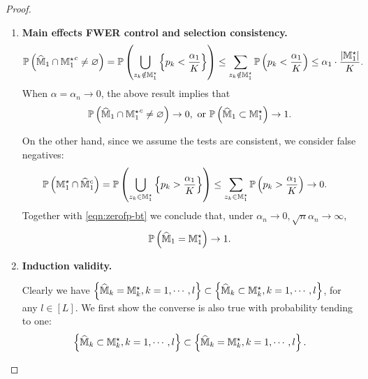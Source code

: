 \documentclass[12pt]{article}
\begin{document}
\begin{proof}
\begin{enumerate}
     Note that when $\alpha_k\to 0, N\to\infty$, we have
    \begin{align*}
        Z_k^\star =  \Theta\lt(\sqrt{2\ln\frac{2|\bbM_{k,+}^\star|}{\alpha_k}}\rt) =  \Theta(\max\{-\delta'\ln N,1\}),~ \lt|\frac{\tau_\cK}{s_\cK}\rt| =  \Theta(N^{1/2+\delta}).
    \end{align*}
    Since $\delta>-1/2$ and $\delta'\le 0$, we have $|\frac{\tau_\cK}{s_\cK}| \to \infty$ and $Z_k^\star/(|\frac{\tau_\cK}{s_\cK}|) \to 0$. Hence the above limit \eqref{eqn:limit} converges to zero. This concludes the proof.
    
    \item \textbf{Main effects FWER control and selection consistency.}
    \begin{align*} 
        {\mathbb{P}}\left(\widehat{{\mathbb{M}}}_1\cap{{\mathbb{M}}^\star_1}^c\neq\varnothing\right)&= {\mathbb{P}}\left(\bigcup_{z_k\notin {\mathbb{M}}^\star_1}\left\{p_k<\frac{\alpha_1}{K}\right\}\right)
        \le \sum_{z_k\notin {\mathbb{M}}^\star_1}{\mathbb{P}}\left(p_k<\frac{\alpha_1}{K}\right)\le  {\alpha_1} \cdot \frac{\left|{\mathbb{M}}^\star_1\right|}{K}.
    \end{align*}
    When $\alpha=\alpha_n\to0$, the above result implies that
    \begin{align}\label{eqn:zerofp-bt}
        {\mathbb{P}}\left(\widehat{{\mathbb{M}}}_1\cap{{\mathbb{M}}^\star_1}^c\neq\varnothing\right)\to 0, \text{ or } {\mathbb{P}}\left(\widehat{{\mathbb{M}}}_1\subset{\mathbb{M}}^\star_1\right)\to 1.
    \end{align}
    
    On the other hand, since we assume the tests are consistent, we consider false negatives:
    \begin{align*} 
        {\mathbb{P}}\left({\mathbb{M}}^\star_1\cap{\widehat{{\mathbb{M}}}_1}^c\right)&= {\mathbb{P}}\left(\bigcup_{z_k\in {\mathbb{M}}^\star_1}\left\{p_k>\frac{\alpha_1}{K}\right\}\right)
        \le \sum_{z_k\in {\mathbb{M}}^\star_1}{\mathbb{P}}\left(p_k>\frac{\alpha_1}{K}\right)\to 0.
    \end{align*}
    Together with \eqref{eqn:zerofp-bt} we conclude that, under $\alpha_n\to0, \sqrt{n}\alpha_n\to\infty$,
    \begin{align*}
        {\mathbb{P}}\left(\widehat{{\mathbb{M}}}_1 = {\mathbb{M}}^\star_1\right)\to 1.
    \end{align*}
    
    \item \textbf{Induction validity.}
    
    Clearly we have $\left\{\widehat{{\mathbb{M}}}_k={\mathbb{M}}^\star_k, k=1,\cdots,l\right\}\subset\left\{\widehat{{\mathbb{M}}}_k\subset{\mathbb{M}}^\star_k, k=1,\cdots,l\right\}$, for any $l\in[L]$. We first show the converse is also true with probability tending to one:
    \begin{align}\label{eqn:zerofn-bt-general}
    \left\{\widehat{{\mathbb{M}}}_k\subset{\mathbb{M}}^\star_k, k=1,\cdots,l\right\}\subset\left\{\widehat{{\mathbb{M}}}_k={\mathbb{M}}^\star_k, k=1,\cdots,l\right\}.
    \end{align}
    

\end{enumerate}
\end{proof}
\end{document}
